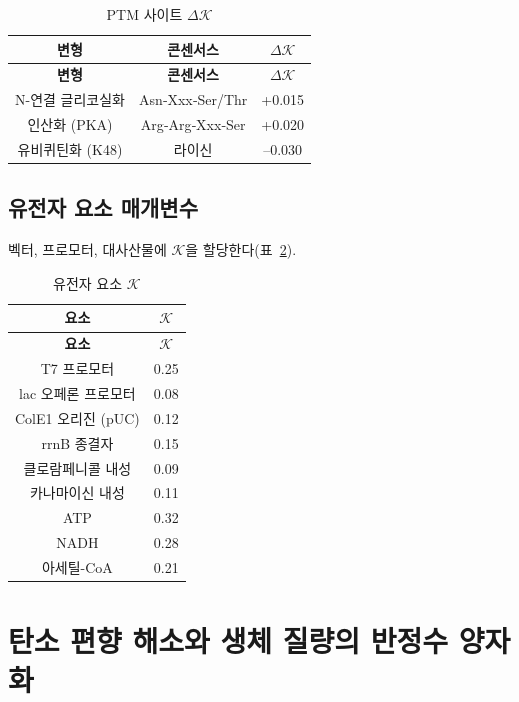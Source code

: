\documentclass[12pt,a4paper]{article}
\newcommand{\REL}{\mathcal{K}}          %
\begin{document}
	\begin{longtable}{|c|c|c|}
		\caption{PTM 사이트 \(\Delta \REL\)}\label{tab:ptm}\\
		\hline
		\textbf{변형} & \textbf{콘센서스} & \(\Delta \REL\) \\
		\hline
		\endfirsthead
		\hline
		\textbf{변형} & \textbf{콘센서스} & \(\Delta \REL\) \\
		\hline
		\endhead
		\hline
		N-연결 글리코실화 & Asn‑Xxx‑Ser/Thr & +0.015 \\
		인산화 (PKA) & Arg‑Arg‑Xxx‑Ser & +0.020 \\
		유비퀴틴화 (K48) & 라이신 & –0.030 \\
		\hline
	\end{longtable}
	
	\subsection{유전자 요소 매개변수}
	벡터, 프로모터, 대사산물에 \(\REL\)을 할당한다(표~\ref{tab:elements}).
	
	\begin{longtable}{|c|c|}
		\caption{유전자 요소 \(\REL\)}\label{tab:elements}\\
		\hline
		\textbf{요소} & \(\REL\) \\
		\hline
		\endfirsthead
		\hline
		\textbf{요소} & \(\REL\) \\
		\hline
		\endhead
		\hline
		T7 프로모터 & 0.25 \\
		lac 오페론 프로모터 & 0.08 \\
		ColE1 오리진 (pUC) & 0.12 \\
		rrnB 종결자 & 0.15 \\
		클로람페니콜 내성 & 0.09 \\
		카나마이신 내성 & 0.11 \\
		ATP & 0.32 \\
		NADH & 0.28 \\
		아세틸-CoA & 0.21 \\
		\hline
	\end{longtable}
	
	\section{탄소 편향 해소와 생체 질량의 반정수 양자화}
	\label{sec:quantization}
	
\end{document}
